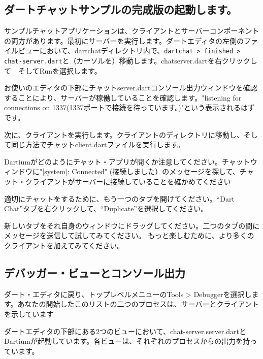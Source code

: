 \subsection{ダートチャットサンプルの完成版の起動します。}

サンプルチャットアプリケーションは、クライアントとサーバーコンポーネントの両方があります。最初にサーバーを実行します。ダートエディタの左側のファイルビューにおいて、dartchatディレクトリ内で、\verb|dartchat > finished > chat-server.dart|と（カーソルを）移動します。chatserver.dartを右クリックして　そしてRunを選択します。


お使いのエディタの下部にチャットserver.dartコンソール出力ウィンドウを確認することにより、サーバーが稼働していることを確認します。"listening for connections on 1337(1337ポートで接続を待っています。)"という表示されるはずです。


次に、クライアントを実行します。クライアントのディレクトリに移動し、そして同じ方法でチャットclient.dartファイルを実行します。


Dartiumがどのようにチャット・アプリが開くか注意してください。チャットウィンドウに"[system]: Connected" (接続しました）のメッセージを探して、チャット・クライアントがサーバーに接続していることを確かめてください


適切にチャットをするために、もう一つのタブを開けてください。“Dart Chat”タブを右クリックして、“Duplicate”を選択してください。


新しいタブをそれ自身のウィンドウにドラッグしてください。二つのタブの間にメッセージを送信して試してみてください。
もっと楽しむために、より多くのクライアントを加えてみてください。


\subsection{デバッガー・ビューとコンソール出力}

ダート・エディタに戻り、トップレベルメニューのTools > Debuggerを選択します。あなたの開始したこのリストの二つのプロセスは、サーバーとクライアントを示しています


ダートエディタの下部にある2つのビューにおいて、chat-server.server.dartとDartiumが起動しています。各ビューは、それぞれのプロセスからの出力を持っています。

